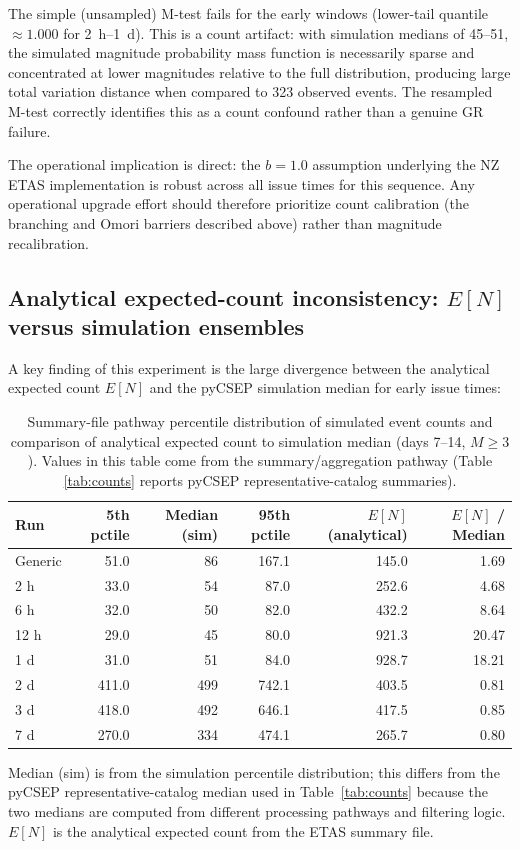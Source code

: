 \documentclass[12pt,letterpaper]{article}
\begin{document}
The simple (unsampled) M-test fails for the early windows (lower-tail quantile
$\approx1.000$ for 2~h--1~d). This is a count artifact: with simulation
medians of 45--51, the simulated magnitude probability mass function is
necessarily sparse and concentrated at lower magnitudes relative to the full
distribution, producing large total variation distance when compared to 323
observed events. The resampled M-test correctly identifies this as a count
confound rather than a genuine GR failure.

The operational implication is direct: the $b=1.0$ assumption underlying the NZ
ETAS implementation is robust across all issue times for this sequence. Any
operational upgrade effort should therefore prioritize count calibration
(the branching and Omori barriers described above) rather than magnitude
recalibration.

\subsection{Analytical expected-count inconsistency: $E[N]$ versus simulation ensembles}
\label{sec:tails}

A key finding of this experiment is the large divergence between
the analytical expected count $E[N]$ and the pyCSEP simulation median for early
issue times:

\begin{table}[ht]
\centering
\small
\caption{Summary-file pathway percentile distribution of simulated event counts
and comparison of analytical expected count to simulation median
(days 7--14, $M\geq3$). Values in this table come from the summary/aggregation
pathway (Table \ref{tab:counts} reports pyCSEP representative-catalog
summaries).}
\label{tab:percentiles}
\begin{tabular}{lrrrrr}
\toprule
Run & 5th pctile & Median (sim) & 95th pctile & $E[N]$ (analytical) & $E[N]$ / Median \\
\midrule
Generic & 51.0 & 86 & 167.1 & 145.0 & 1.69 \\
2 h & 33.0 & 54 & 87.0 & 252.6 & 4.68 \\
6 h & 32.0 & 50 & 82.0 & 432.2 & 8.64 \\
12 h & 29.0 & 45 & 80.0 & 921.3 & 20.47 \\
1 d & 31.0 & 51 & 84.0 & 928.7 & 18.21 \\
2 d & 411.0 & 499 & 742.1 & 403.5 & 0.81 \\
3 d & 418.0 & 492 & 646.1 & 417.5 & 0.85 \\
7 d & 270.0 & 334 & 474.1 & 265.7 & 0.80 \\
\bottomrule
\end{tabular}
\vspace{4pt}
\raggedright
\footnotesize
Median (sim) is from the simulation percentile distribution; this differs
from the pyCSEP representative-catalog median used in
Table~\ref{tab:counts} because the two medians are computed from different
processing pathways and filtering logic. $E[N]$ is the analytical expected
count from the ETAS summary file.
\end{table}
\end{document}

